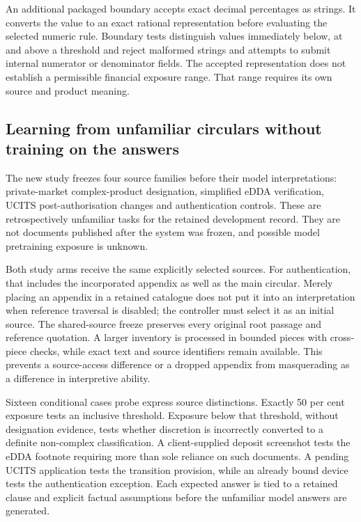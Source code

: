 \documentclass[12pt,a4paper,oneside,openany]{book}
\begin{document}
An additional packaged boundary accepts exact decimal percentages as strings.
It converts the value to an exact rational representation before evaluating the
selected numeric rule. Boundary tests distinguish values immediately below,
at and above a threshold and reject malformed strings and attempts to submit
internal numerator or denominator fields. The accepted representation does not
establish a permissible financial exposure range. That range requires its own
source and product meaning.

\subsection{Learning from unfamiliar circulars without training on the answers}

The new study freezes four source families before their model interpretations:
private-market complex-product designation, simplified eDDA verification, UCITS
post-authorisation changes and authentication controls. These are retrospectively
unfamiliar tasks for the retained development record. They are not documents
published after the system was frozen, and possible model pretraining exposure
is unknown.

Both study arms receive the same explicitly selected sources. For authentication,
that includes the incorporated appendix as well as the main circular. Merely
placing an appendix in a retained catalogue does not put it into an interpretation
when reference traversal is disabled; the controller must select it as an initial
source. The shared-source freeze preserves every original root passage and
reference quotation. A larger inventory is processed in bounded pieces with
cross-piece checks, while exact text and source identifiers remain available.
This prevents a source-access difference or a dropped appendix from masquerading
as a difference in interpretive ability.

Sixteen conditional cases probe express source distinctions. Exactly 50 per
cent exposure tests an inclusive threshold. Exposure below that threshold,
without designation evidence, tests whether discretion is incorrectly converted
to a definite non-complex classification. A client-supplied deposit screenshot
tests the eDDA footnote requiring more than sole reliance on such documents.
A pending UCITS application tests the transition provision, while an already
bound device tests the authentication exception. Each expected answer is tied
to a retained clause and explicit factual assumptions before the unfamiliar
model answers are generated.
\end{document}
